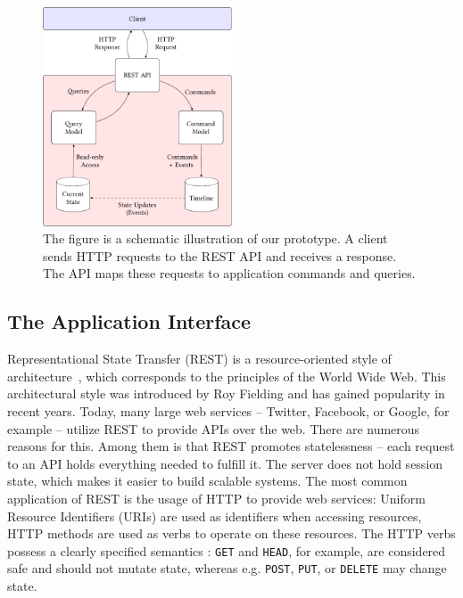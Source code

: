 \begin{figure}
	\centering
	\includegraphics[width=0.5\textwidth]{../illustrations/rest.pdf}
	\caption{
		The figure is a schematic illustration of our prototype.
		A client sends HTTP requests to the REST API and receives a 
		response. The API maps these requests to application commands 
		and queries.
	}
	\label{fig:rest}
\end{figure}

\subsection{The Application Interface}


Representational State Transfer (REST) is a resource-oriented style of architecture~\cite{Fielding2000},
which corresponds to the principles of the World Wide Web. This architectural 
style was introduced by Roy Fielding and has gained popularity in recent years. 
Today, many large web services -- Twitter, Facebook, or Google, for example -- 
utilize REST to provide APIs over the web.
There are numerous reasons for this. Among them is that REST promotes statelessness -- 
each request to an API holds everything needed to fulfill it. The server does not 
hold session state, which makes it easier to build scalable systems.
The most common application of REST is the usage of HTTP to provide web services: 
Uniform Resource Identifiers (URIs) are used as identifiers when accessing 
resources, HTTP methods are used as verbs to operate on these resources. 
The HTTP verbs possess a clearly specified semantics \cite{RFC2616}: 
\texttt{GET} and \texttt{HEAD}, for example, are considered safe and should not 
mutate state, whereas e.g. \texttt{POST}, \texttt{PUT}, or \texttt{DELETE} may 
change state.

